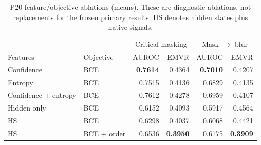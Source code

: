 \begin{table}[t]
\centering
\caption{P20 feature/objective ablations (means). These are diagnostic ablations, not replacements for the frozen primary results. HS denotes hidden states plus native signals.}
\label{tab:ablations}
\small
\begin{tabular}{llrr|rr}
\toprule
& & \multicolumn{2}{c}{Critical masking} & \multicolumn{2}{c}{Mask $\rightarrow$ blur} \\
Features & Objective & AUROC & EMVR & AUROC & EMVR \\
\midrule
Confidence & BCE & \textbf{0.7614} & 0.4364 & \textbf{0.7010} & 0.4207 \\
Entropy & BCE & 0.7515 & 0.4136 & 0.6829 & 0.4135 \\
Confidence + entropy & BCE & 0.7612 & 0.4278 & 0.6959 & 0.4107 \\
Hidden only & BCE & 0.6152 & 0.4093 & 0.5917 & 0.4564 \\
HS & BCE & 0.6298 & 0.4037 & 0.6068 & 0.4421 \\
HS & BCE + order & 0.6536 & \textbf{0.3950} & 0.6175 & \textbf{0.3909} \\
\bottomrule
\end{tabular}
\end{table}
